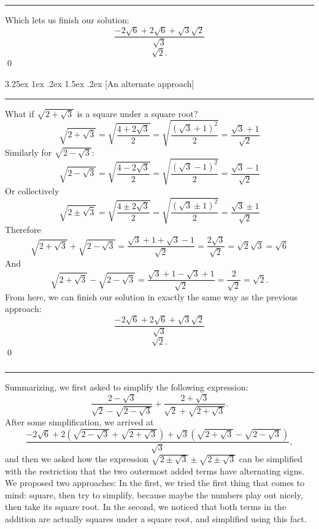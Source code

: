 \documentclass{article}
\makeatletter
\newcounter{subsubsubsection}[subsubsection]
\newcounter{subsubsubsubsection}[subsubsubsection]
\renewcommand\subsubsubsubsection{%
  \@startsection{subsubsubsubsection}{5}{\z@}%
  {3.25ex \@plus1ex \@minus.2ex}%
  {1.5ex \@plus .2ex}%
  {\normalfont\normalsize\bfseries}%
}
\makeatother
\begin{document}
\vspace{10pt}
\hrule
\vspace{10pt}

Which lets us finish our solution:
\[
\frac{-2\sqrt{6} + 2{\sqrt{6}} + \sqrt{3}\sqrt{2}}{\sqrt{3}}
\]
\[
\boxed{\sqrt{2}.}
\] \qed

\subsubsubsubsection[An alternate approach]{}
\vspace{-4pt}
\hrule
\vspace{10pt}
What if $\sqrt{2 + \sqrt{3}}$ is a square under a square root? 
\[
\sqrt{2 + \sqrt{3}} = \sqrt{\frac{4 + 2\sqrt{3}}{2}} = \sqrt{\frac{(\sqrt{3} + 1)^2}{2}} = \frac{\sqrt{3} + 1}{\sqrt{2}}
\]
Similarly for $\sqrt{2 - \sqrt{3}}$:
\[
\sqrt{2 - \sqrt{3}} = \sqrt{\frac{4 - 2\sqrt{3}}{2}} = \sqrt{\frac{(\sqrt{3} - 1)^2}{2}} = \frac{\sqrt{3} - 1}{\sqrt{2}}
\]
Or collectively
\[
\sqrt{2 \pm \sqrt{3}} = \sqrt{\frac{4 \pm 2\sqrt{3}}{2}} = \sqrt{\frac{(\sqrt{3} \pm 1)^2}{2}} = \frac{\sqrt{3} \pm 1}{\sqrt{2}}
\]
Therefore
\[
\sqrt{2 + \sqrt{3}} + \sqrt{2 - \sqrt{3}} = \frac{\sqrt{3} + 1 + \sqrt{3} - 1}{\sqrt{2}} = \frac{2\sqrt{3}}{\sqrt{2}} = \sqrt{2}\sqrt{3} = \sqrt{6}
\]
And
\[
\sqrt{2 + \sqrt{3}} - \sqrt{2 - \sqrt{3}} = \frac{\sqrt{3} + 1 - \sqrt{3} + 1}{\sqrt{2}} = \frac{2}{\sqrt{2}} = \sqrt{2}.
\]
From here, we can finish our solution in exactly the same way as the previous approach:
\[
\frac{-2\sqrt{6} + 2{\sqrt{6}} + \sqrt{3}\sqrt{2}}{\sqrt{3}}
\]
\[
\boxed{\sqrt{2}.}
\] \qed

\subsubsection[Summary]{}
\vspace{-8pt}
\hrule
\vspace{10pt}
Summarizing, we first asked to simplify the following expression:
\[
\frac{2 - \sqrt{3}}{\sqrt{2} - \sqrt{2 - \sqrt{3}}} + \frac{2 + \sqrt{3}}{\sqrt{2} + \sqrt{2 + \sqrt{3}}}.
\]
After some simplification, we arrived at
\[
\frac{-2\sqrt{6} + 2(\sqrt{2 - \sqrt{3}} + \sqrt{2 + \sqrt{3}}) + \sqrt{3}(\sqrt{2 + \sqrt{3}} - \sqrt{2 - \sqrt{3}})}{\sqrt{3}},
\]
and then we asked how the expression $\sqrt{2 \pm \sqrt{3}} \pm \sqrt{2 \pm \sqrt{3}}$ can be simplified with the restriction that the two outermost added terms have alternating signs.
We proposed two approaches: In the first, we tried the first thing that comes to mind: square, then try to simplify, because maybe the numbers play out nicely, then take its square root. In the second, we noticed that both terms in the addition are actually squares under a square root, and simplified using this fact. \\
\end{document}
